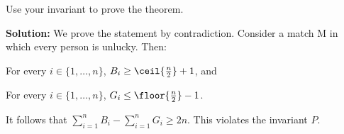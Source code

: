 \ppart
Use your invariant to prove the theorem.

\begin{solution}
\medskip
\textbf{Solution:}
We prove the statement by contradiction.  Consider a match M in which
every person is unlucky.  Then:
\begin{description}
\item For every $i \in \{ 1, \ldots, n \}$, 
$B_i \geq \ceil{\frac{n}{2}} + 1$, and
\item For every $i \in \{ 1, \ldots, n \}$,
$G_i \leq \floor{\frac{n}{2}} - 1$.
\end{description}

It follows that $\sum_{i=1} ^n B_i - \sum_{i=1} ^n G_i \geq 2n$.  This
violates the invariant $P$.

\end{solution}  
